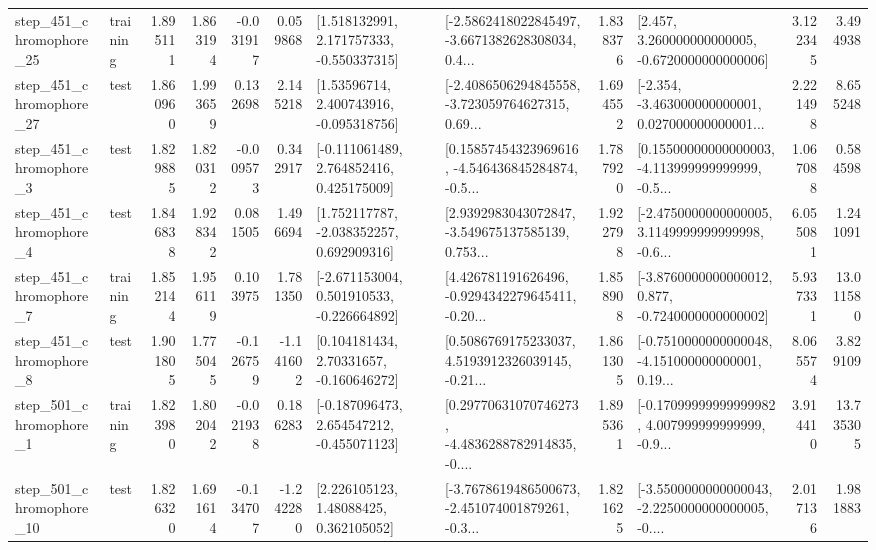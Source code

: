 \begin{tabular}{llrrrrllrlrr}
  step\_451\_chromophore\_25 &  training &      1.895111 &    1.863194 &     -0.031917 &  0.059868 &    [1.518132991, 2.171757333, -0.550337315] &  [-2.5862418022845497, -3.6671382628308034, 0.4... &       1.838376 &    [2.457, 3.260000000000005, -0.6720000000000006] &            3.122345 &          3.494938 \\
  step\_451\_chromophore\_27 &      test &      1.860960 &    1.993659 &      0.132698 &  2.145218 &     [1.53596714, 2.400743916, -0.095318756] &  [-2.4086506294845558, -3.723059764627315, 0.69... &       1.694552 &  [-2.354, -3.463000000000001, 0.027000000000001... &            2.221498 &          8.655248 \\
   step\_451\_chromophore\_3 &      test &      1.829885 &    1.820312 &     -0.009573 &  0.342917 &    [-0.111061489, 2.764852416, 0.425175009] &  [0.15857454323969616, -4.546436845284874, -0.5... &       1.787920 &  [0.15500000000000003, -4.113999999999999, -0.5... &            1.067088 &          0.584598 \\
   step\_451\_chromophore\_4 &      test &      1.846838 &    1.928342 &      0.081505 &  1.496694 &    [1.752117787, -2.038352257, 0.692909316] &  [2.9392983043072847, -3.549675137585139, 0.753... &       1.922798 &  [-2.4750000000000005, 3.1149999999999998, -0.6... &            6.055081 &          1.241091 \\
   step\_451\_chromophore\_7 &  training &      1.852144 &    1.956119 &      0.103975 &  1.781350 &   [-2.671153004, 0.501910533, -0.226664892] &  [4.426781191626496, -0.9294342279645411, -0.20... &       1.858908 &  [-3.8760000000000012, 0.877, -0.7240000000000002] &            5.937331 &         13.011580 \\
   step\_451\_chromophore\_8 &      test &      1.901805 &    1.775045 &     -0.126759 & -1.141602 &     [0.104181434, 2.70331657, -0.160646272] &  [0.5086769175233037, 4.5193912326039145, -0.21... &       1.861305 &  [-0.7510000000000048, -4.151000000000001, 0.19... &            8.065574 &          3.829109 \\
   step\_501\_chromophore\_1 &  training &      1.823980 &    1.802042 &     -0.021938 &  0.186283 &   [-0.187096473, 2.654547212, -0.455071123] &  [0.29770631070746273, -4.4836288782914835, -0.... &       1.895361 &  [-0.17099999999999982, 4.007999999999999, -0.9... &            3.914410 &         13.735305 \\
  step\_501\_chromophore\_10 &      test &      1.826320 &    1.691614 &     -0.134707 & -1.242280 &      [2.226105123, 1.48088425, 0.362105052] &  [-3.7678619486500673, -2.451074001879261, -0.3... &       1.821625 &  [-3.5500000000000043, -2.2250000000000005, -0.... &            2.017136 &          1.981883 \\

\end{tabular}
